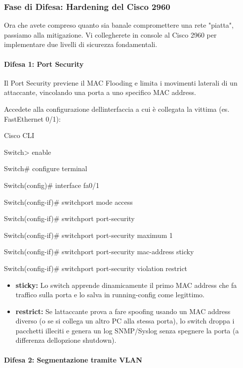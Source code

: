 \documentclass[11pt,a4paper]{article}
\begin{document}
\subsubsection{Fase di Difesa: Hardening del Cisco
2960}\label{fase-di-difesa-hardening-del-cisco-2960}

Ora che avete compreso quanto sia banale compromettere una rete
"piatta", passiamo alla mitigazione. Vi collegherete in console al Cisco
2960 per implementare due livelli di sicurezza fondamentali.

\paragraph{Difesa 1: Port Security}\label{difesa-1-port-security}

Il Port Security previene il MAC Flooding e limita i movimenti laterali
di un attaccante, vincolando una porta a uno specifico MAC address.

Accedete alla configurazione dell\textquotesingle interfaccia a cui è
collegata la vittima (es. FastEthernet 0/1):

Cisco CLI

Switch\textgreater{} enable

Switch\# configure terminal

Switch(config)\# interface fa0/1

Switch(config-if)\# switchport mode access

Switch(config-if)\# switchport port-security

Switch(config-if)\# switchport port-security maximum 1

Switch(config-if)\# switchport port-security mac-address sticky

Switch(config-if)\# switchport port-security violation restrict

\begin{itemize}
\item
  \textbf{sticky:} Lo switch apprende dinamicamente il primo MAC address
  che fa traffico sulla porta e lo salva in running-config come
  legittimo.
\item
  \textbf{restrict:} Se l\textquotesingle attaccante prova a fare
  spoofing usando un MAC address diverso (o se si collega un altro PC
  alla stessa porta), lo switch droppa i pacchetti illeciti e genera un
  log SNMP/Syslog senza spegnere la porta (a differenza
  dell\textquotesingle opzione shutdown).
\end{itemize}

\paragraph{Difesa 2: Segmentazione tramite
VLAN}\label{difesa-2-segmentazione-tramite-vlan}
\end{document}
